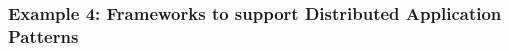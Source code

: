 \documentclass[10pt,letterpaper]{article}
\begin{document}

\subsubsection*{Example 4: Frameworks to support Distributed Application
  Patterns}


\end{document}
